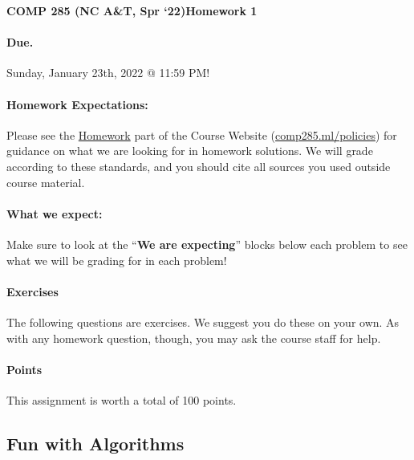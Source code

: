 \documentclass [12pt]{article}
\begin{document}
 

{\LARGE \textbf {COMP 285 (NC A\&T, Spr `22)}\hfill \textbf {Homework 1} } 
\vspace {1em} 
\begin {Instruction} 

\paragraph {Due.} Sunday, January 23th, 2022 @ 11:59 PM!
\end {Instruction} 

\vspace {1em} 
\begin {Instruction} \paragraph {Homework Expectations:} Please see the \href{https://www.comp285.ml/homework/#general-homework-information}{Homework} part of the Course Website (\href{https://www.comp285.ml/policies/#collaboration-policy-and-honor-code}{comp285.ml/policies}) for guidance on what we are looking for in homework solutions. We will grade according to these standards, and you should cite all sources you used outside course material.

\paragraph {What we expect:} Make sure to look at the ``\textbf {We are expecting}'' blocks below each problem to see what we will be grading for in each problem! \end {Instruction}

\vspace {1em} 
\begin {Instruction} 

\paragraph {Exercises} The following questions are exercises. We suggest you do these on your own. As with any homework question, though, you may ask the course staff for help.

\paragraph {Points} This assignment is worth a total of 100 points.
\end {Instruction} 

\begin{centering}
\section*{Fun with Algorithms}
\end{centering}
\end{document}
